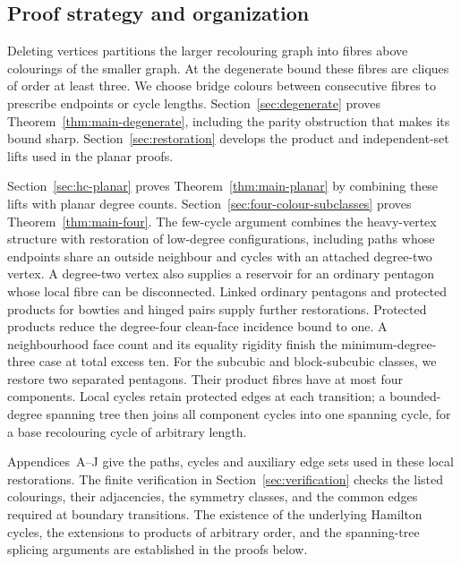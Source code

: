 \documentclass[11pt]{article}
\theoremstyle{remark}
\numberwithin{equation}{section}
\numberwithin{table}{section}
\begin{document}
\subsection{Proof strategy and organization}
Deleting vertices partitions the larger recolouring graph into fibres
above colourings of the smaller graph. At the degenerate bound these
fibres are cliques of order at least three. We choose bridge colours
between consecutive fibres to prescribe endpoints or cycle lengths.
Section~\ref{sec:degenerate} proves Theorem~\ref{thm:main-degenerate},
including the parity obstruction that makes its bound sharp.
Section~\ref{sec:restoration} develops the product and independent-set
lifts used in the planar proofs.

Section~\ref{sec:hc-planar} proves Theorem~\ref{thm:main-planar} by
combining these lifts with planar degree counts. Section~\ref{sec:four-colour-subclasses}
proves Theorem~\ref{thm:main-four}. The few-cycle argument combines the
heavy-vertex structure with restoration of low-degree configurations, including
paths whose endpoints share an outside neighbour and cycles with an attached
degree-two vertex. A degree-two vertex also supplies a reservoir for an
ordinary pentagon whose local fibre can be disconnected. Linked ordinary
pentagons and protected products for bowties and hinged pairs supply
further restorations. Protected products reduce the degree-four clean-face
incidence bound to one. A neighbourhood face count and its equality rigidity finish the
minimum-degree-three case at total excess ten. For the subcubic and block-subcubic classes,
we restore two separated pentagons. Their product fibres have at most
four components. Local cycles retain protected edges at each transition;
a bounded-degree spanning tree then joins all component cycles into
one spanning cycle, for a base recolouring cycle of arbitrary length.

Appendices~A--J give the paths, cycles and auxiliary edge sets used in
these local restorations. The finite verification in
Section~\ref{sec:verification} checks the listed colourings, their
adjacencies, the symmetry classes, and the common edges required at
boundary transitions. The existence of the underlying Hamilton cycles,
the extensions to products of arbitrary order, and the spanning-tree
splicing arguments are established in the proofs below.
\end{document}
